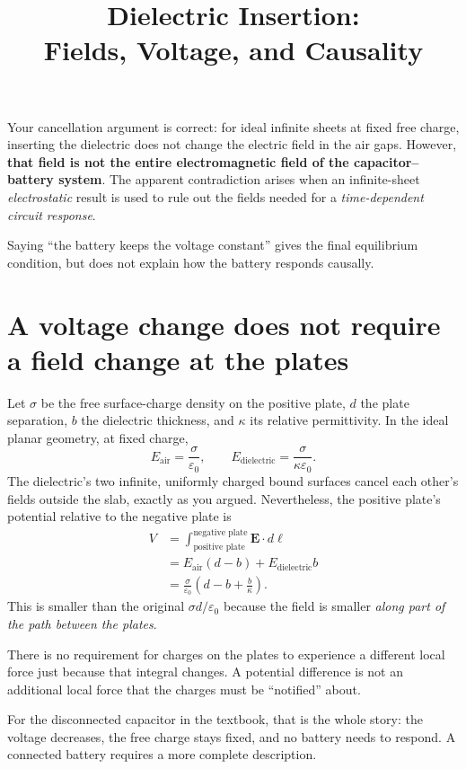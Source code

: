 \documentclass[11pt,letterpaper]{article}
\title{Dielectric Insertion:\\Fields, Voltage, and Causality}
\author{}
\date{}
\begin{document}
\maketitle

Your cancellation argument is correct: for ideal infinite sheets at fixed free
charge, inserting the dielectric does not change the electric field in the air
gaps. However, \textbf{that field is not the entire electromagnetic field of the
capacitor--battery system}. The apparent contradiction arises when an
infinite-sheet \emph{electrostatic} result is used to rule out the fields needed
for a \emph{time-dependent circuit response}.

Saying ``the battery keeps the voltage constant'' gives the final equilibrium
condition, but does not explain how the battery responds causally.

\section{A voltage change does not require a field change at the plates}

Let $\sigma$ be the free surface-charge density on the positive plate, $d$ the
plate separation, $b$ the dielectric thickness, and $\kappa$ its relative
permittivity. In the ideal planar geometry, at fixed charge,
\[
    E_{\mathrm{air}}=\frac{\sigma}{\varepsilon_0},
    \qquad
    E_{\mathrm{dielectric}}=\frac{\sigma}{\kappa\varepsilon_0}.
\]
The dielectric's two infinite, uniformly charged bound surfaces cancel each
other's fields outside the slab, exactly as you argued. Nevertheless, the
positive plate's potential relative to the negative plate is
\begin{align*}
    V
    &=\int_{\text{positive plate}}^{\text{negative plate}}
        \mathbf{E}\cdot d\boldsymbol{\ell} \\
    &=E_{\mathrm{air}}(d-b)+E_{\mathrm{dielectric}}b \\
    &=\frac{\sigma}{\varepsilon_0}
        \left(d-b+\frac{b}{\kappa}\right).
\end{align*}
This is smaller than the original $\sigma d/\varepsilon_0$ because the field is
smaller \emph{along part of the path between the plates}.

There is no requirement for charges on the plates to experience a different
local force just because that integral changes. A potential difference is not
an additional local force that the charges must be ``notified'' about.

For the disconnected capacitor in the textbook, that is the whole story: the
voltage decreases, the free charge stays fixed, and no battery needs to respond.
A connected battery requires a more complete description.
\end{document}

